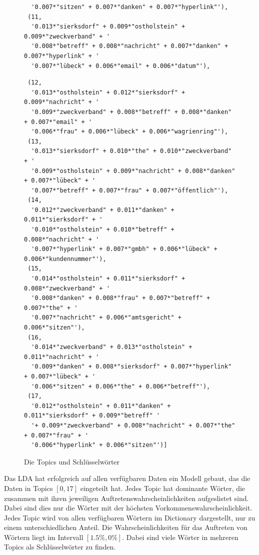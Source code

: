 \documentclass[german,version-2020-11]{uzl-thesis}
\begin{document}
\begin{itemize}
\begin{enumerate}
\begin{figure}[h]
\begin{lstlisting}
  '0.007*"sitzen" + 0.007*"danken" + 0.007*"hyperlink"'),
 (11,
  '0.013*"sierksdorf" + 0.009*"ostholstein" + 0.009*"zweckverband" + '
  '0.008*"betreff" + 0.008*"nachricht" + 0.007*"danken" + 0.007*"hyperlink" + '
  '0.007*"lübeck" + 0.006*"email" + 0.006*"datum"'),
  \end{lstlisting}
  \end{figure}
  \newpage
  \begin{figure}[h]
  \begin{lstlisting}
 (12,
  '0.013*"ostholstein" + 0.012*"sierksdorf" + 0.009*"nachricht" + '
  '0.009*"zweckverband" + 0.008*"betreff" + 0.008*"danken" + 0.007*"email" + '
  '0.006*"frau" + 0.006*"lübeck" + 0.006*"wagrienring"'),
 (13,
  '0.013*"sierksdorf" + 0.010*"the" + 0.010*"zweckverband" + '
  '0.009*"ostholstein" + 0.009*"nachricht" + 0.008*"danken" + 0.007*"lübeck" + '
  '0.007*"betreff" + 0.007*"frau" + 0.007*"öffentlich"'),
 (14,
  '0.012*"zweckverband" + 0.011*"danken" + 0.011*"sierksdorf" + '
  '0.010*"ostholstein" + 0.010*"betreff" + 0.008*"nachricht" + '
  '0.007*"hyperlink" + 0.007*"gmbh" + 0.006*"lübeck" + 0.006*"kundennummer"'),
 (15,
  '0.014*"ostholstein" + 0.011*"sierksdorf" + 0.008*"zweckverband" + '
  '0.008*"danken" + 0.008*"frau" + 0.007*"betreff" + 0.007*"the" + '
  '0.007*"nachricht" + 0.006*"amtsgericht" + 0.006*"sitzen"'),
 (16,
  '0.014*"zweckverband" + 0.013*"ostholstein" + 0.011*"nachricht" + '
  '0.009*"danken" + 0.008*"sierksdorf" + 0.007*"hyperlink" + 0.007*"lübeck" + '
  '0.006*"sitzen" + 0.006*"the" + 0.006*"betreff"'),
 (17,
  '0.012*"ostholstein" + 0.011*"danken" + 0.011*"sierksdorf" + 0.009*"betreff" '
  '+ 0.009*"zweckverband" + 0.008*"nachricht" + 0.007*"the" + 0.007*"frau" + '
  '0.006*"hyperlink" + 0.006*"sitzen"')]
\end{lstlisting}
\caption{Die Topics und Schlüsselwörter}
\label{fig:codeoutput}
\end{figure}

Das LDA hat erfolgreich auf allen verfügbaren Daten ein Modell gebaut, das die Daten in Topics $[0,17]$ eingeteilt hat. Jedes Topic hat dominante Wörter, die zusammen mit ihren jeweiligen Auftretenswahrscheinlichkeiten aufgeslistet sind. Dabei sind dies nur die Wörter mit der höchsten Vorkommenswahrscheinlichkeit. Jedes Topic wird von allen verfügbaren Wörtern im Dictionary dargestellt, nur zu einem unterschiedlichen Anteil. Die Wahrscheinlichkeiten für das Auftreten von Wörtern liegt im Intervall $[1.5\%,0\%]$. Dabei sind viele Wörter in mehreren Topics als Schlüsselwörter zu finden. \\



\end{enumerate}
\end{itemize}
\end{document}
